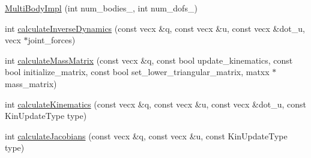 \begin{CompactItemize}
\item 
\hyperlink{classbt_inverse_dynamics_1_1_multi_body_tree_1_1_multi_body_impl_1451e035a52b67c1804d7dd0dd799af2}{MultiBodyImpl} (int num\_\-bodies\_\-, int num\_\-dofs\_\-)
\item 
int \hyperlink{classbt_inverse_dynamics_1_1_multi_body_tree_1_1_multi_body_impl_408ca0c5fe8fcd75b2b8672e96c2237a}{calculateInverseDynamics} (const vecx \&q, const vecx \&u, const vecx \&dot\_\-u, vecx $\ast$joint\_\-forces)
\item 
int \hyperlink{classbt_inverse_dynamics_1_1_multi_body_tree_1_1_multi_body_impl_6e4b376b92377b3350d4ebfd94652a0f}{calculateMassMatrix} (const vecx \&q, const bool update\_\-kinematics, const bool initialize\_\-matrix, const bool set\_\-lower\_\-triangular\_\-matrix, matxx $\ast$mass\_\-matrix)
\item 
int \hyperlink{classbt_inverse_dynamics_1_1_multi_body_tree_1_1_multi_body_impl_32cb26dc4a94027f8206182f5a528bea}{calculateKinematics} (const vecx \&q, const vecx \&u, const vecx \&dot\_\-u, const KinUpdateType type)
\item 
\hypertarget{classbt_inverse_dynamics_1_1_multi_body_tree_1_1_multi_body_impl_3864ebdf6fe5e3589945f347e8d188a7}{
int \hyperlink{classbt_inverse_dynamics_1_1_multi_body_tree_1_1_multi_body_impl_3864ebdf6fe5e3589945f347e8d188a7}{calculateJacobians} (const vecx \&q, const vecx \&u, const KinUpdateType type)}
\label{classbt_inverse_dynamics_1_1_multi_body_tree_1_1_multi_body_impl_3864ebdf6fe5e3589945f347e8d188a7}


\end{CompactItemize}

